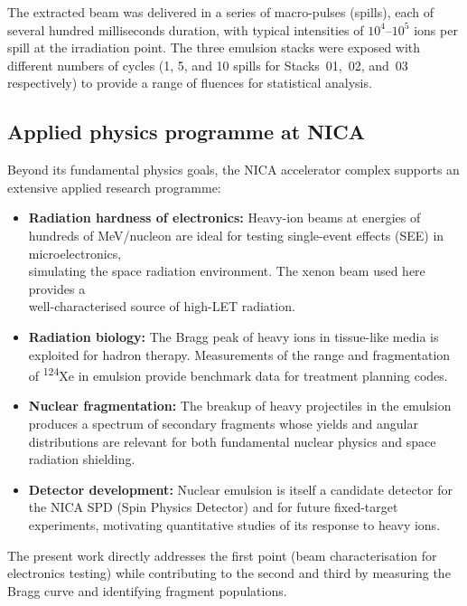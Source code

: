 \documentclass[12pt,a4paper]{article}
\begin{document}
The extracted beam was delivered in a series of macro-pulses
(spills), each of several hundred milliseconds duration, with
typical intensities of $10^{4}$--$10^{5}$ ions per spill at the
irradiation point. The three emulsion stacks were exposed with
different numbers of cycles (1, 5, and 10 spills for Stacks~01,~02,
and~03 respectively) to provide a range of fluences for statistical
analysis.

\subsection{Applied physics programme at NICA}

Beyond its fundamental physics goals, the NICA accelerator complex
supports an extensive applied research programme:

\begin{itemize}
  \item \textbf{Radiation hardness of electronics:} Heavy-ion beams at
        energies of hundreds of MeV/nucleon are ideal for testing
        single-event effects (SEE) in microelectronics,\\ simulating the
        space radiation environment. The xenon beam used here provides a \\
        well-characterised source of high-LET radiation.
  \item \textbf{Radiation biology:} The Bragg peak of heavy ions in
        tissue-like media is exploited for hadron therapy. Measurements
        of the range and fragmentation of \textsuperscript{124}Xe in
        emulsion provide benchmark data for treatment planning codes.
  \item \textbf{Nuclear fragmentation:} The breakup of heavy projectiles
        in the emulsion produces a spectrum of secondary fragments
        whose yields and angular distributions are relevant for both
        fundamental nuclear physics and space radiation shielding.
  \item \textbf{Detector development:} Nuclear emulsion is itself a
        candidate detector for the NICA SPD (Spin Physics Detector)
        and for future fixed-target experiments, motivating
        quantitative studies of its response to heavy ions.
\end{itemize}

The present work directly addresses the first point (beam characterisation
for electronics testing) while contributing to the second and third by
measuring the Bragg curve and identifying fragment populations.
\end{document}
